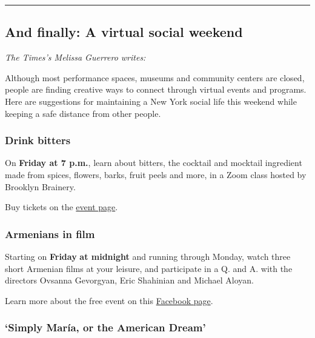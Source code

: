 \begin{center}\rule{0.5\linewidth}{\linethickness}\end{center}

\hypertarget{and-finally-a-virtual-social-weekend}{%
\subsection{And finally: A virtual social
weekend}\label{and-finally-a-virtual-social-weekend}}

\emph{The Times's Melissa Guerrero writes:}

Although most performance spaces, museums and community centers are
closed, people are finding creative ways to connect through virtual
events and programs. Here are suggestions for maintaining a New York
social life this weekend while keeping a safe distance from other
people.

\hypertarget{drink-bitters}{%
\subsubsection{Drink bitters}\label{drink-bitters}}

On \textbf{Friday at 7 p.m.}, learn about bitters, the cocktail and
mocktail ingredient made from spices, flowers, barks, fruit peels and
more, in a Zoom class hosted by Brooklyn Brainery.

Buy tickets on the
\href{https://brooklynbrainery.com/courses/drink-bitters-online-class}{event
page}.

\hypertarget{armenians-in-film}{%
\subsubsection{\texorpdfstring{\textbf{Armenians in
film}}{Armenians in film}}\label{armenians-in-film}}

Starting on \textbf{Friday} \textbf{at midnight} and running through
Monday, watch three short Armenian films at your leisure, and
participate in a Q. and A. with the directors Ovsanna Gevorgyan, Eric
Shahinian and Michael Aloyan.

Learn more about the free event on this
\href{https://www.facebook.com/events/294771018623803/}{Facebook page}.

\hypertarget{simply-maruxeda-or-the-american-dream}{%
\subsubsection{\texorpdfstring{\textbf{`Simply María, or the American
Dream'}}{`Simply María, or the American Dream'}}\label{simply-maruxeda-or-the-american-dream}}

